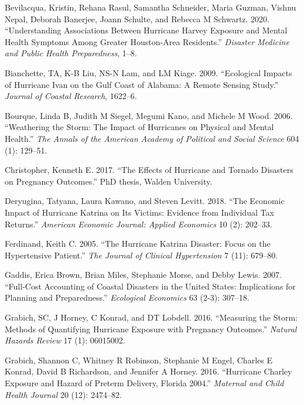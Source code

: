 \documentclass[
]{article}
\begin{document}
\leavevmode\hypertarget{ref-bevilacqua2020understanding}{}%
Bevilacqua, Kristin, Rehana Rasul, Samantha Schneider, Maria Guzman,
Vishnu Nepal, Deborah Banerjee, Joann Schulte, and Rebecca M Schwartz.
2020. ``Understanding Associations Between Hurricane Harvey Exposure and
Mental Health Symptoms Among Greater Houston-Area Residents.''
\emph{Disaster Medicine and Public Health Preparedness}, 1--8.

\leavevmode\hypertarget{ref-bianchette2009ecological}{}%
Bianchette, TA, K-B Liu, NS-N Lam, and LM Kiage. 2009. ``Ecological
Impacts of Hurricane Ivan on the Gulf Coast of Alabama: A Remote Sensing
Study.'' \emph{Journal of Coastal Research}, 1622--6.

\leavevmode\hypertarget{ref-bourque2006weathering}{}%
Bourque, Linda B, Judith M Siegel, Megumi Kano, and Michele M Wood.
2006. ``Weathering the Storm: The Impact of Hurricanes on Physical and
Mental Health.'' \emph{The Annals of the American Academy of Political
and Social Science} 604 (1): 129--51.

\leavevmode\hypertarget{ref-christopher2017effects}{}%
Christopher, Kenneth E. 2017. ``The Effects of Hurricane and Tornado
Disasters on Pregnancy Outcomes.'' PhD thesis, Walden University.

\leavevmode\hypertarget{ref-deryugina2018economic}{}%
Deryugina, Tatyana, Laura Kawano, and Steven Levitt. 2018. ``The
Economic Impact of Hurricane Katrina on Its Victims: Evidence from
Individual Tax Returns.'' \emph{American Economic Journal: Applied
Economics} 10 (2): 202--33.

\leavevmode\hypertarget{ref-ferdinand2005hurricane}{}%
Ferdinand, Keith C. 2005. ``The Hurricane Katrina Disaster: Focus on the
Hypertensive Patient.'' \emph{The Journal of Clinical Hypertension} 7
(11): 679--80.

\leavevmode\hypertarget{ref-gaddis2007full}{}%
Gaddis, Erica Brown, Brian Miles, Stephanie Morse, and Debby Lewis.
2007. ``Full-Cost Accounting of Coastal Disasters in the United States:
Implications for Planning and Preparedness.'' \emph{Ecological
Economics} 63 (2-3): 307--18.

\leavevmode\hypertarget{ref-grabich2016measuring}{}%
Grabich, SC, J Horney, C Konrad, and DT Lobdell. 2016. ``Measuring the
Storm: Methods of Quantifying Hurricane Exposure with Pregnancy
Outcomes.'' \emph{Natural Hazards Review} 17 (1): 06015002.

\leavevmode\hypertarget{ref-grabich2016hurricane}{}%
Grabich, Shannon C, Whitney R Robinson, Stephanie M Engel, Charles E
Konrad, David B Richardson, and Jennifer A Horney. 2016. ``Hurricane
Charley Exposure and Hazard of Preterm Delivery, Florida 2004.''
\emph{Maternal and Child Health Journal} 20 (12): 2474--82.
\end{document}
